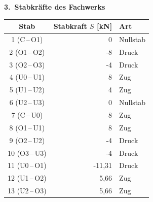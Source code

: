 \documentclass[a4paper,11pt]{article}
\begin{document}
\par\medskip\textbf{3.\ Stabkr\"afte des Fachwerks}\par
\begin{center}\renewcommand{\arraystretch}{1.15}
\begin{tabular}{c r l}
\toprule
Stab & Stabkraft $S$ [kN] & Art \\
\midrule
  1 (C\,--\,O1) & 0 & Nullstab \\
  2 (O1\,--\,O2) & -8 & Druck \\
  3 (O2\,--\,O3) & -4 & Druck \\
  4 (U0\,--\,U1) & 8 & Zug \\
  5 (U1\,--\,U2) & 4 & Zug \\
  6 (U2\,--\,U3) & 0 & Nullstab \\
  7 (C\,--\,U0) & 8 & Zug \\
  8 (O1\,--\,U1) & 8 & Zug \\
  9 (O2\,--\,U2) & -4 & Druck \\
  10 (O3\,--\,U3) & -4 & Druck \\
  11 (U0\,--\,O1) & -11,31 & Druck \\
  12 (U1\,--\,O2) & 5,66 & Zug \\
  13 (U2\,--\,O3) & 5,66 & Zug \\
\bottomrule
\end{tabular}\end{center}
\end{document}
